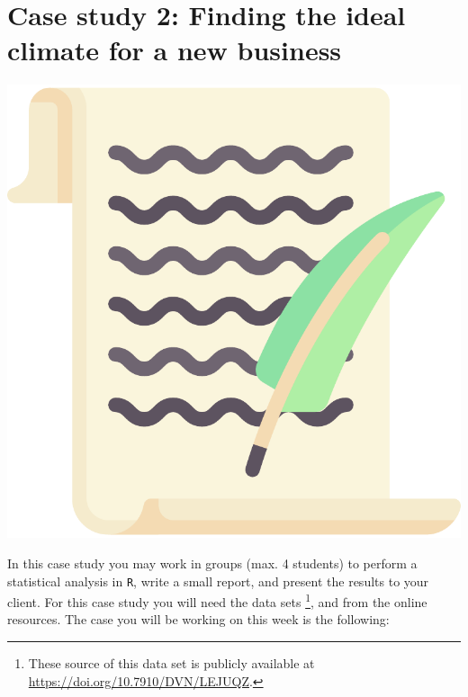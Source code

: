 
\begin{minipage}{0.8\textwidth}
\section{Case study 2: Finding the ideal climate for a new business}
\end{minipage}%
\hfill%
\begin{minipage}{0.1\textwidth}
\includegraphics[width=\linewidth]{Files/Images/lettericon.pdf}
\end{minipage}
\vspace*{.1cm}

In this case study you may work in groups (max. 4 students) to perform a statistical analysis in \texttt{R}, write a small report, and present the results to your client. For this case study you will need the data sets \footnote{These source of this data set is publicly available at \url{https://doi.org/10.7910/DVN/LEJUQZ}.},  and  from the online resources. The case you will be working on this week is the following: \\

